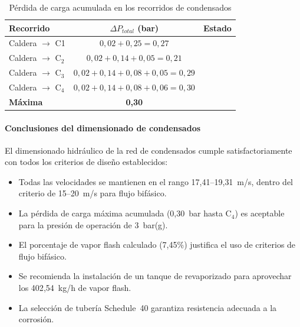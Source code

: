 \documentclass[12pt]{article}
\begin{document}
\begin{table}[H]
	\centering
	\caption{Pérdida de carga acumulada en los recorridos de condensados}
	\label{tab:perdidas-condensados}
	\begin{tabular}{lcc}
		\toprule
		\textbf{Recorrido}          & \textbf{$\Delta P_{total}$ (bar)}            & \textbf{Estado} \\
		\midrule
		Caldera $\rightarrow$ C1 & $0{,}02 + 0{,}25 = 0{,}27$                   & \checkmark      \\
		Caldera $\rightarrow$ C$_2$ & $0{,}02 + 0{,}14 + 0{,}05 = 0{,}21$          & \checkmark      \\
		Caldera $\rightarrow$ C$_3$ & $0{,}02 + 0{,}14 + 0{,}08 + 0{,}05 = 0{,}29$ & \checkmark      \\
		Caldera $\rightarrow$ C$_4$ & $0{,}02 + 0{,}14 + 0{,}08 + 0{,}06 = 0{,}30$ & \checkmark      \\
		\midrule
		\textbf{Máxima}             & \textbf{0{,}30}                              & \checkmark      \\
		\bottomrule
	\end{tabular}
\end{table}

\paragraph{Conclusiones del dimensionado de condensados}

El dimensionado hidráulico de la red de condensados cumple satisfactoriamente con todos los criterios de diseño establecidos:

\begin{itemize}[noitemsep]
	\item Todas las velocidades se mantienen en el rango 17{,}41--19{,}31~m/s, dentro del criterio de 15--20~m/s para flujo bifásico.
	\item La pérdida de carga máxima acumulada (0{,}30~bar hasta C$_4$) es aceptable para la presión de operación de 3~bar(g).
	\item El porcentaje de vapor flash calculado (7{,}45\%) justifica el uso de criterios de flujo bifásico.
	\item Se recomienda la instalación de un tanque de revaporizado para aprovechar los 402{,}54~kg/h de vapor flash.
	\item La selección de tubería Schedule~40 garantiza resistencia adecuada a la corrosión.
\end{itemize}
\end{document}
